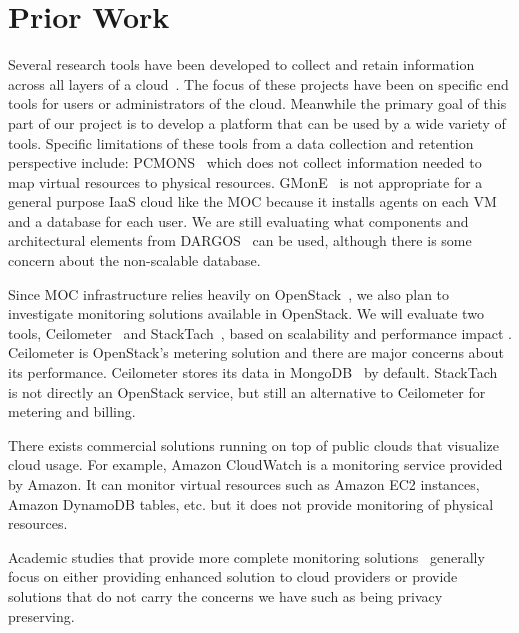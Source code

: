 

\section{Prior Work}
\label{sec:PriorWork}

%

Several research tools have been developed to collect and retain information across all layers of  a cloud~\cite{chaves2011toward,montes2013gmone,povedano2013dargos,alcaraz2015monpaas}.  The focus of these projects have been on specific end tools for users or administrators of the cloud. Meanwhile the primary goal of this part of our project is to develop a platform that can be used by a wide variety of tools. Specific limitations of these tools from a data collection and retention perspective include:  PCMONS~\cite{chaves2011toward}  which does not collect information needed to map virtual resources to physical resources. GMonE~\cite{montes2013gmone} is not appropriate for a general purpose IaaS cloud like the MOC because  it installs agents on each VM and a database for each user.  We are still evaluating what components and architectural elements from DARGOS~\cite{povedano2013dargos} can be used, although there is some concern about the non-scalable database. 

Since MOC infrastructure relies heavily on OpenStack~\cite{sefraoui2012openstack}, we also plan to investigate monitoring solutions available in OpenStack. We will evaluate two tools, Ceilometer~\cite{ceilometer} and  StackTach~\cite{stacktach}, based on scalability and performance impact . Ceilometer is OpenStack’s metering solution and there are major concerns about its performance. Ceilometer stores its data in MongoDB~\cite{mongodb} by default. StackTach~\cite{stacktach} is not directly an OpenStack service, but still an alternative to Ceilometer for metering and billing.

There exists commercial solutions running on top of public clouds that visualize cloud usage. For example, Amazon CloudWatch is a monitoring service provided by Amazon. It can monitor virtual resources such as Amazon EC2 instances, Amazon DynamoDB tables, etc. but it does not provide monitoring of physical resources. 

Academic studies that provide more complete monitoring solutions~\cite{chaves2011toward, montes2013gmone, povedano2013dargos, alcaraz2015monpaas} generally focus on either providing enhanced solution to cloud providers or provide solutions that do not carry the concerns we have such as being privacy preserving.